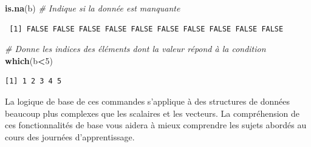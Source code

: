 \documentclass[12pt,]{book}
\newenvironment{Shaded}{\begin{snugshade}}{\end{snugshade}}
\newcommand{\CommentTok}[1]{\textcolor[rgb]{0.56,0.35,0.01}{\textit{#1}}}
\newcommand{\DecValTok}[1]{\textcolor[rgb]{0.00,0.00,0.81}{#1}}
\newcommand{\KeywordTok}[1]{\textcolor[rgb]{0.13,0.29,0.53}{\textbf{#1}}}
\newcommand{\NormalTok}[1]{#1}
\newcommand{\OperatorTok}[1]{\textcolor[rgb]{0.81,0.36,0.00}{\textbf{#1}}}
\begin{document}
\begin{Shaded}
\begin{Highlighting}[]
\KeywordTok{is.na}\NormalTok{(b)                   }\CommentTok{# Indique si la donnée est manquante}
\end{Highlighting}
\end{Shaded}

\begin{verbatim}
 [1] FALSE FALSE FALSE FALSE FALSE FALSE FALSE FALSE FALSE FALSE
\end{verbatim}

\begin{Shaded}
\begin{Highlighting}[]
\CommentTok{# Donne les indices des éléments dont la valeur répond à la condition}
\KeywordTok{which}\NormalTok{(b}\OperatorTok{<}\DecValTok{5}\NormalTok{)}
\end{Highlighting}
\end{Shaded}

\begin{verbatim}
[1] 1 2 3 4 5
\end{verbatim}

La logique de base de ces commandes s'applique à des structures de données beaucoup plus complexes que les scalaires et les vecteurs. La compréhension de ces fonctionnalités de base vous aidera à mieux comprendre les sujets abordés au cours des journées d'apprentissage.

\hypertarget{refs}{}

\printbibliography
\end{document}
